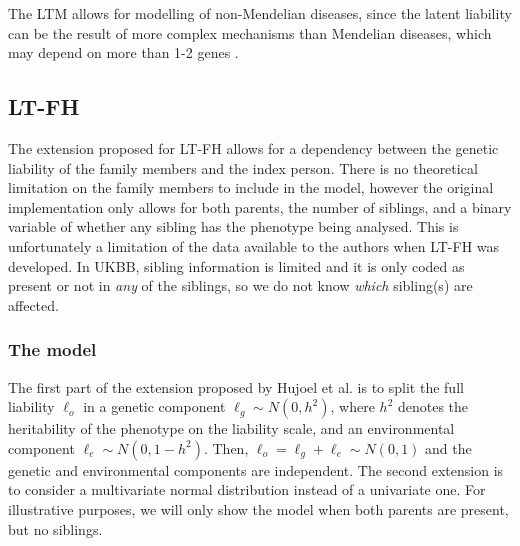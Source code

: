 The LTM allows for modelling of non-Mendelian diseases, since the latent liability can be the result of more complex mechanisms than Mendelian diseases, which may depend on more than 1-2 genes \cite{falconer1967inheritance,falconer1965inheritance}. 


\subsection{LT-FH}
The extension proposed for LT-FH allows for a dependency between the genetic liability of the family members and the index person. There is no theoretical limitation on the family members to include in the model, however the original implementation only allows for both parents, the number of siblings, and a binary variable of whether any sibling has the phenotype being analysed. This is unfortunately a limitation of the data available to the authors when LT-FH was developed. In UKBB, sibling information is limited and it is only coded as present or not in \textit{any} of the siblings, so we do not know \textit{which} sibling(s) are affected. 

\subsubsection{The model}

The first part of the extension proposed by Hujoel et al.\cite{hujoel2020liability} is to split the full liability $ \ell_o $ in a genetic component $ \ell_g \sim N(0,h^2) $, where $ h^2 $ denotes the heritability of the phenotype on the liability scale, and an environmental component $ \ell_e \sim N(0, 1-h^2) $. Then, $ \ell_o = \ell_g + \ell_e \sim N(0,1) $ and the genetic and environmental components are independent. The second extension is to consider a multivariate normal distribution instead of a univariate one. For illustrative purposes, we will only show the model when both parents are present, but no siblings. 

